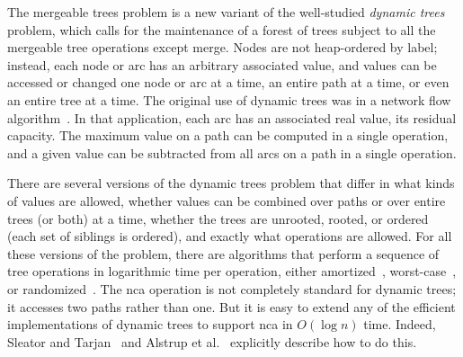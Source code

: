 \documentclass[twoside,leqno,twocolumn]{article}
\begin{document}
The mergeable trees problem is a new variant of the well-studied \emph{dynamic trees} problem, which calls for the maintenance of a forest of trees subject to all the mergeable tree operations except merge.  Nodes are not heap-ordered by label; instead, each node or arc has an arbitrary associated value, and values can be accessed or changed one node or arc at a time, an entire path at a time, or even an entire tree at a time.  The original use of dynamic trees was in a network flow algorithm~\cite{ST83}.  In that application, each arc has an associated real value, its residual capacity.  The maximum value on a path can be computed in a single operation, and a given value can be subtracted from all arcs on a path in a single operation.

There are several versions of the dynamic trees problem that differ in what kinds of values are allowed, whether values can be combined over paths or over entire trees (or both) at a time, whether the trees are unrooted, rooted, or ordered (each set of siblings is ordered), and exactly what operations are allowed.  For all these versions of the problem, there are algorithms that perform a sequence of tree operations in logarithmic time per operation,  either amortized~\cite{ST85,TW05}, worst-case~\cite{AHTdL05,Fre85,ST83}, or randomized~\cite{ABHVW04}. The nca operation is not completely standard for dynamic trees; it accesses two paths rather than one.  But it is easy to extend any of the efficient implementations of dynamic trees to support nca in $O(\log n)$ time.  Indeed, Sleator and Tarjan~\cite{ST83} and Alstrup et al.~\cite{AHTdL05} explicitly describe how to do this.
\end{document}
